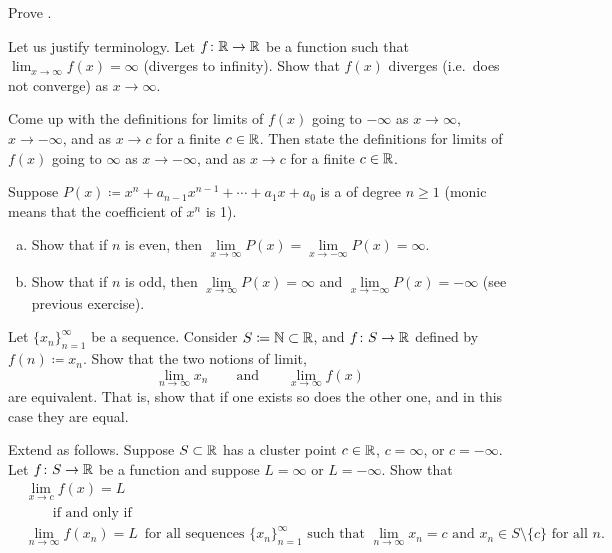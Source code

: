 \begin{exercise}
Prove .
\end{exercise}

\begin{exercise}
Let us justify terminology.
Let $f \colon {\mathbb{R}} \to {\mathbb{R}}$ be a function such that
$\lim_{x \to \infty} f(x) = \infty$ (diverges to infinity).
Show that $f(x)$ diverges (i.e.\ does not converge) as $x \to \infty$.
\end{exercise}

\begin{exercise}
Come up with the definitions for limits of $f(x)$ going to $-\infty$ as $x \to
\infty$, $x \to -\infty$, and as $x \to c$ for a finite $c \in {\mathbb{R}}$.
Then state the definitions for limits of $f(x)$ going to $\infty$ 
as $x \to -\infty$, and as $x \to c$ for a finite $c \in {\mathbb{R}}$.
\end{exercise}

\begin{exercise}
Suppose $P(x) \coloneqq x^n + a_{n-1} x^{n-1} + \cdots + a_1 x + a_0$ is a \emph{}
of degree $n \geq 1$ (monic means that the coefficient of $x^n$ is 1).
\begin{enumerate}[a)]
\item
Show that if $n$ is even, then $\lim\limits_{x\to\infty} P(x) = 
\lim\limits_{x\to-\infty} P(x) = \infty$.
\item
Show that if $n$ is odd, then
$\lim\limits_{x\to\infty} P(x) = \infty$ and
$\lim\limits_{x\to-\infty} P(x) = -\infty$ (see previous exercise).
\end{enumerate}
\end{exercise}

\begin{exercise}
Let $\{ x_n \}_{n=1}^\infty$ be a sequence.  Consider $S \coloneqq {\mathbb{N}} \subset {\mathbb{R}}$, and
$f \colon S \to {\mathbb{R}}$ defined by $f(n) \coloneqq x_n$.  Show that
the two notions of limit,
\begin{equation*}
\lim_{n\to\infty} x_n \qquad \text{and} \qquad
\lim_{x\to\infty} f(x) 
\end{equation*}
are equivalent.  That is, show that if one exists so does
the other one, and in this case they are equal.
\end{exercise}

\begin{exercise}
Extend  as follows.
Suppose $S \subset {\mathbb{R}}$ has a cluster point $c \in {\mathbb{R}}$, $c = \infty$,
or $c = -\infty$.  Let $f \colon S \to {\mathbb{R}}$ be a function and suppose
$L = \infty$ or $L = -\infty$.  Show that
\begin{equation*}
\begin{aligned}
&
\lim_{x\to c} f(x) = L
\\
&
\qquad \text{if and only if}
\\
&
\lim_{n\to\infty} f(x_n) = L \enspace \text{for all sequences }
\{ x_n \}_{n=1}^\infty \text{ such that } \lim_{n\to\infty} x_n = c
\text{ and } x_n \in S \setminus \{c\}
\text{ for all } n  .
\end{aligned}
\end{equation*}
\end{exercise}

